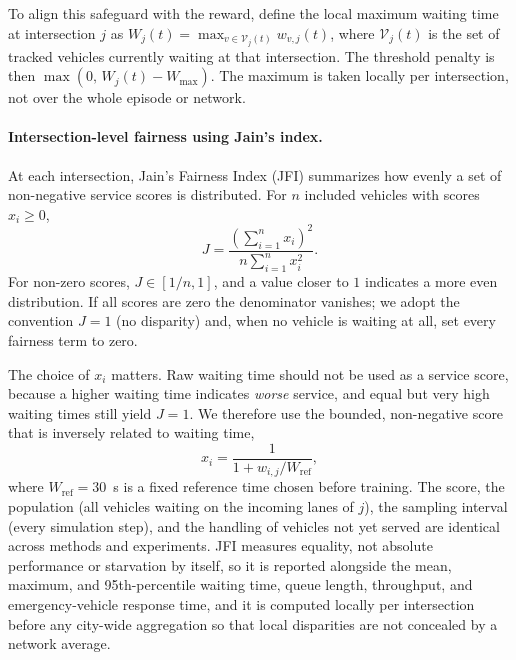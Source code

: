 \documentclass[3p,times]{elsarticle}
\theoremstyle{plain}
\theoremstyle{definition}
\begin{document}
To align this safeguard with the reward, define the local maximum waiting time at intersection
$j$ as $W_j(t)=\max_{v\in\mathcal{V}_j(t)} w_{v,j}(t)$, where $\mathcal{V}_j(t)$ is the set of
tracked vehicles currently waiting at that intersection. The threshold penalty is then
$\max(0,\,W_j(t)-W_{\max})$. The maximum is taken locally per intersection, not over the whole
episode or network.

\paragraph{Intersection-level fairness using Jain's index.}
At each intersection, Jain's Fairness Index (JFI) summarizes how evenly a set of non-negative
service scores is distributed. For $n$ included vehicles with scores $x_i\ge 0$,
\begin{equation}
J=\frac{\left(\sum_{i=1}^{n}x_i\right)^2}{n\sum_{i=1}^{n}x_i^{2}}.
\end{equation}
For non-zero scores, $J\in[1/n,1]$, and a value closer to $1$ indicates a more even
distribution. If all scores are zero the denominator vanishes; we adopt the convention
$J=1$ (no disparity) and, when no vehicle is waiting at all, set every fairness term to zero.

The choice of $x_i$ matters. Raw waiting time should not be used as a service score, because a
higher waiting time indicates \emph{worse} service, and equal but very high waiting times still
yield $J=1$. We therefore use the bounded, non-negative score that is inversely related to
waiting time,
\begin{equation}
x_i=\frac{1}{1+w_{i,j}/W_{\mathrm{ref}}},
\end{equation}
where $W_{\mathrm{ref}}=30$~s is a fixed reference time chosen before training. The score, the
population (all vehicles waiting on the incoming lanes of $j$), the sampling interval (every
simulation step), and the handling of vehicles not yet served are identical across methods and
experiments. JFI measures equality, not absolute performance or starvation by itself, so it is
reported alongside the mean, maximum, and 95th-percentile waiting time, queue length,
throughput, and emergency-vehicle response time, and it is computed locally per intersection
before any city-wide aggregation so that local disparities are not concealed by a network
average.
\end{document}
